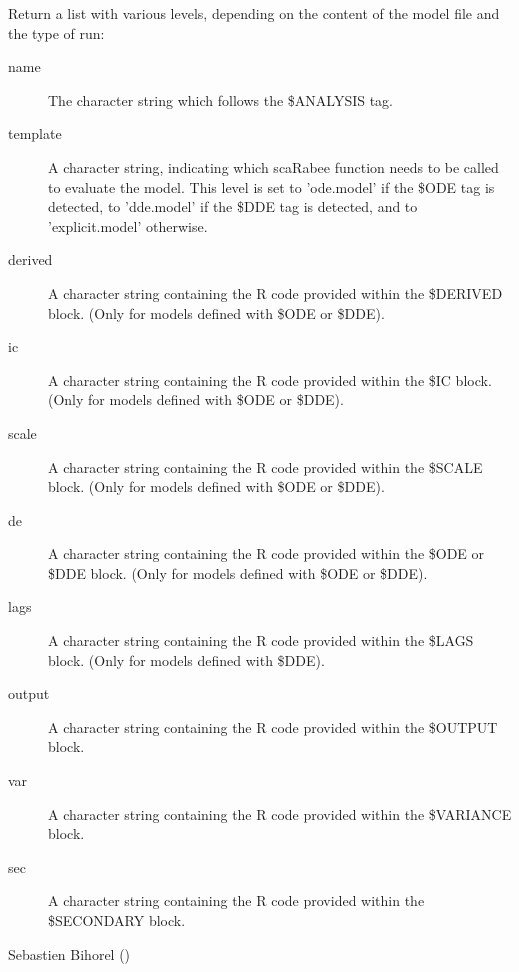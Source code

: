 %
\begin{Value}
Return a list with various levels, depending on the content of the model file
and the type of run:\begin{description}

\item[name] The character string which follows the \$ANALYSIS tag.
\item[template] A character string, indicating which scaRabee function needs
to be called to evaluate the model. This level is set to 'ode.model' if
the \$ODE tag is detected, to 'dde.model' if the \$DDE tag is detected, and 
to 'explicit.model' otherwise.
\item[derived] A character string containing the R code provided within the
\$DERIVED block. (Only for models defined with \$ODE or \$DDE).
\item[ic] A character string containing the R code provided within the \$IC 
block. (Only for models defined with \$ODE or \$DDE).
\item[scale] A character string containing the R code provided within the
\$SCALE block. (Only for models defined with \$ODE or \$DDE).
\item[de] A character string containing the R code provided within the
\$ODE or \$DDE block. (Only for models defined with \$ODE or \$DDE).
\item[lags] A character string containing the R code provided within the
\$LAGS block. (Only for models defined with \$DDE).
\item[output] A character string containing the R code provided within the
\$OUTPUT block.
\item[var] A character string containing the R code provided within the
\$VARIANCE block.
\item[sec] A character string containing the R code provided within the
\$SECONDARY block.

\end{description}

\end{Value}
%
\begin{Author}\relax
Sebastien Bihorel ()
\end{Author}
%
\begin{SeeAlso}\relax
{}
\end{SeeAlso}
